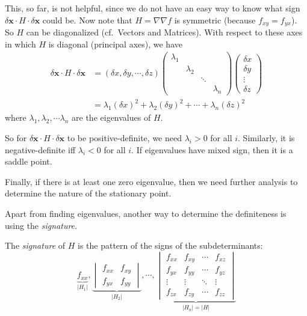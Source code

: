 \documentclass[a4paper]{article}
\begin{document}
This, so far, is not helpful, since we do not have an easy way to know what sign $\delta \mathbf{x}\cdot H\cdot \delta \mathbf{x}$ could be. Now note that $H = \nabla\nabla f$ is symmetric (because $f_{xy} = f_{yx}$). So $H$ can be diagonalized (cf.\ Vectors and Matrices). With respect to these axes in which $H$ is diagonal (principal axes), we have
\begin{align*}
  \delta\mathbf{x}\cdot H\cdot \delta\mathbf{x} &= (\delta x, \delta y, \cdots, \delta z)
  \begin{pmatrix}
    \lambda_1\\
    &\lambda_2\\
    &&\ddots\\
    &&&\lambda_n
  \end{pmatrix}
  \begin{pmatrix}
    \delta x\\\delta y\\\vdots\\\delta z
  \end{pmatrix}\\
  &= \lambda_1(\delta x)^2 + \lambda_2 (\delta y)^2 + \cdots + \lambda_n(\delta z)^2
\end{align*}
where $\lambda_1, \lambda_2, \cdots \lambda_n$ are the eigenvalues of $H$.

So for $\delta \mathbf{x}\cdot H\cdot \delta \mathbf{x}$ to be positive-definite, we need $\lambda_i > 0$ for all $i$. Similarly, it is negative-definite iff $\lambda_i < 0$ for all $i$. If eigenvalues have mixed sign, then it is a saddle point.

Finally, if there is at least one zero eigenvalue, then we need further analysis to determine the nature of the stationary point.

Apart from finding eigenvalues, another way to determine the definiteness is using the \emph{signature}.
\begin{defi}
  The \emph{signature} of $H$ is the pattern of the signs of the subdeterminants:
  \[
    \underbrace{f_{xx}}_{|H_1|},
    \underbrace{
      \begin{vmatrix}
        f_{xx} & f_{xy}\\
        f_{yx} & f_{yy}
      \end{vmatrix}}_{|H_2|},\cdots,
    \underbrace{\begin{vmatrix}
      f_{xx} & f_{xy} & \cdots & f_{xz}\\
      f_{yx} & f_{yy} & \cdots & f_{yz}\\
      \vdots & \vdots & \ddots & \vdots\\
      f_{zx} & f_{zy} & \cdots & f_{zz}
    \end{vmatrix}}_{|H_n| = |H|}
  \]
\end{defi}
\end{document}
